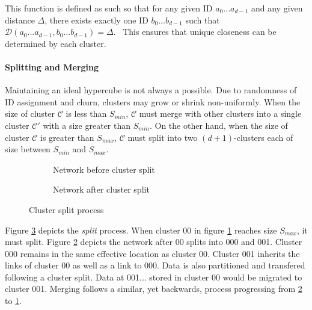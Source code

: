 \documentclass[12pt]{report}
\theoremstyle{plain}
\begin{document}
			This function is defined as such so that for any given ID $a_0...a_{d-1}$ and any given distance $\Delta$,
			there exists exactly one ID $b_0...b_{d-1}$ such that $\mathcal{D}(a_0...a_{d-1},b_0...b_{d-1}) = \Delta$. \
			This ensures that unique closeness can be determined by each cluster.
						
			\paragraph*{Splitting and Merging}
			Maintaining an ideal hypercube is not always a possible. Due to randomness of ID assignment and churn, clusters may grow or shrink non-uniformly.
			When the size of cluster $\mathcal{C}$ is less than $S_{min}$, 
			$\mathcal{C}$ must merge with other clusters into a single cluster $\mathcal{C'}$ with a size greater than $S_{min}$.
			On the other hand, when the size of cluster $\mathcal{C}$ is greater than $S_{max}$, 
			$\mathcal{C}$ must split into two $(d+1)$-clusters each of size between $S_{min}$ and $S_{max}$.
			
			\vspace{0.2cm}
			
			\begin{figure}[H]
				\begin{subfigure}{.5\textwidth}
				\centering
				
				\vspace{2.2em}
				\caption{Network before cluster split}
				\label{fig:preSplit}
				\end{subfigure}
				\begin{subfigure}{.5\textwidth}
				\centering
				\vspace{-0.6em}
				
				\captionsetup{}
				\caption{Network after cluster split}
				\label{fig:postSplit}
				\end{subfigure}
				\captionsetup{}
				\caption{Cluster split process}
				\label{fig:Split}
			\end{figure}
			
			Figure \ref{fig:Split} depicts the \emph{split} process. When cluster 00 in figure \ref{fig:preSplit} reaches size $S_{max}$, it must split.
			Figure \ref{fig:postSplit} depicts the network after 00 splits into 000 and 001. 
			Cluster 000 remains in the same effective location as cluster 00. Cluster 001 inherits the links of cluster 00 as well as a link to 000.
			Data is also partitioned and transfered following a cluster split. Data at 001... stored in cluster 00 would be migrated to cluster 001. 
			Merging follows a similar,
			yet backwards, process progressing from \ref{fig:postSplit} to \ref{fig:preSplit}.
			
\end{document}
